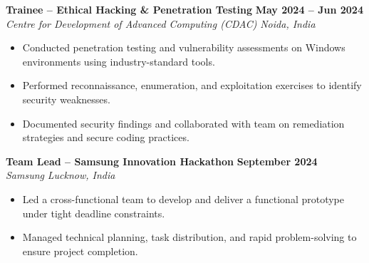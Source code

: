 \documentclass[10pt,letterpaper]{article}
\newcommand{\subheading}[2]{%
  \noindent\textit{\textcolor{subheadinggrey}{#1}} \hfill \textit{\textcolor{subheadinggrey}{#2}}%
}
\begin{document}
\noindent \textbf{Trainee -- Ethical Hacking \& Penetration Testing} \hfill \textbf{May 2024 -- Jun 2024} \\
\subheading{Centre for Development of Advanced Computing (CDAC)}{Noida, India}
\begin{itemize}
    \item Conducted penetration testing and vulnerability assessments on Windows environments using industry-standard tools.
    \item Performed reconnaissance, enumeration, and exploitation exercises to identify security weaknesses.
    \item Documented security findings and collaborated with team on remediation strategies and secure coding practices.
\end{itemize}
\vspace{4pt}
\noindent \textbf{Team Lead -- Samsung Innovation Hackathon} \hfill \textbf{September 2024} \\
\subheading{Samsung}{Lucknow, India}
\begin{itemize}
    \item Led a cross-functional team to develop and deliver a functional prototype under tight deadline constraints.
    \item Managed technical planning, task distribution, and rapid problem-solving to ensure project completion.
\end{itemize}
\end{document}
